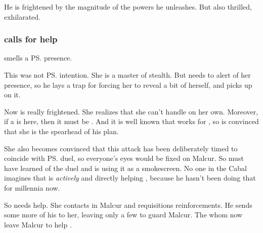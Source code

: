 \begin{garbage}
He is frightened by the magnitude of the powers he unleashes. 
But also thrilled, exhilarated.






\subsubsection{\Achsah{} calls for help}
\Achsah{} smells a \ps{\dragon}{} presence. 

This was not \ps{\Nzessuacrith}{} intention. 
She is a master of stealth. 
But \Secherdamon{} needs to alert \Achsah{} of her presence, so he lays a trap for \Nzessuacrith{} forcing her to reveal a bit of herself, and \Achsah{} picks up on it. 

Now \Achsah{} is really frightened. 
She realizes that she can't handle \Nzessuacrith{} on her own. 
Moreover, if a \dragon{} is here, then it must be . 
And it is well known that \Nzessuacrith{} works for \Secherdamon, so \Achsah{} is convinced that she is the spearhead of his plan. 

She also becomes convinced that this attack has been deliberately timed to coincide with \ps{\Teshrial} duel, so everyone's eyes would be fixed on Malcur. 
So \Secherdamon{} must have learned of the duel and is using it as a smokescreen. 
No one in the Cabal imagines that \Ishnaruchaefir{} is \emph{actively} and directly helping \Secherdamon, because he hasn't been doing that for millennia now. 

So \Achsah{} needs help. 
She contacts \Teshrial{} in Malcur and requisitions reinforcements. 
He sends some more of his \resphain{} to her, leaving only a few to guard Malcur. 
The \resphain{} whom \Teshrial{}  now leave Malcur to help \Achsah. 


\end{garbage}
